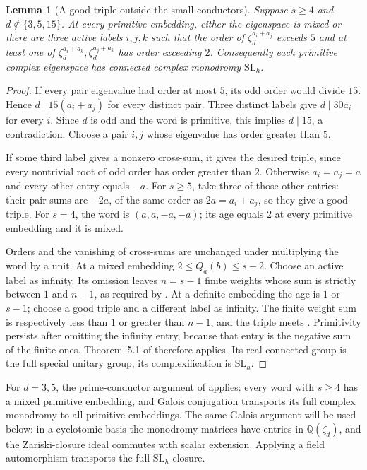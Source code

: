 \documentclass[11pt]{article}
\newtheorem{lemma}[theorem]{Lemma}
\theoremstyle{definition}
\begin{document}
\begin{lemma}[A good triple outside the small conductors]
\label{lem:odd-good-triple}
Suppose $s\ge4$ and $d\notin\{3,5,15\}$. At every primitive embedding,
either the eigenspace is mixed or there are three active labels $i,j,k$
such that the order of $\zeta_d^{a_i+a_j}$ exceeds $5$ and at least one
of $\zeta_d^{a_i+a_k},\zeta_d^{a_j+a_k}$ has order exceeding $2$.
Consequently each primitive complex eigenspace has connected complex
monodromy $\mathrm{SL}_h$.
\end{lemma}
\begin{proof}
If every pair eigenvalue had order at most $5$, its odd order would
divide $15$. Hence $d\mid15(a_i+a_j)$ for every distinct pair. Three
distinct labels give $d\mid30a_i$ for every $i$. Since $d$ is odd and
the word is primitive, this implies $d\mid15$, a contradiction.
Choose a pair $i,j$ whose eigenvalue has order greater than $5$.

If some third label gives a nonzero cross-sum, it gives the desired
triple, since every nontrivial root of odd order has order greater than
$2$. Otherwise $a_i=a_j=a$ and every other entry equals $-a$.
For $s\ge5$, take three of those other entries: their pair sums are
$-2a$, of the same order as $2a=a_i+a_j$, so they give a good triple.
For $s=4$, the word is $(a,a,-a,-a)$; its age equals $2$ at every
primitive embedding and it is mixed.

Orders and the vanishing of cross-sums are unchanged under multiplying
the word by a unit. At a mixed embedding $2\le Q_a(b)\le s-2$.
Choose an active label as infinity. Its omission leaves $n=s-1$ finite
weights whose sum is strictly between $1$ and $n-1$, as required by
\cite[Definition~1.1(a)]{MN}. At a definite embedding the age is
$1$ or $s-1$; choose a good triple and a different label as infinity.
The finite weight sum is respectively less than $1$ or greater than
$n-1$, and the triple meets \cite[Definition~1.1(b)]{MN}.
Primitivity persists after omitting the infinity entry, because that
entry is the negative sum of the finite ones. Theorem~5.1 of
\cite{MN} therefore applies. Its real connected group is the full
special unitary group; its complexification is $\mathrm{SL}_h$.
\end{proof}

For $d=3,5$, the prime-conductor argument of \cite[Section~2]{General}
applies: every word
with $s\ge4$ has a mixed primitive embedding, and Galois conjugation
transports its full complex monodromy to all primitive embeddings.
The same Galois argument will be used below: in a cyclotomic basis the
monodromy matrices have entries in $\mathbb Q(\zeta_d)$, and the
Zariski-closure ideal commutes with scalar extension. Applying a field
automorphism transports the full $\mathrm{SL}_h$ closure.
\end{document}
